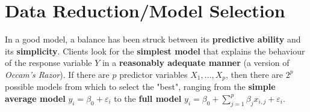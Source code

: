 
\section{Data Reduction/Model Selection} \label{sec:Data.Red}
In a good model, a balance has been struck between its \textbf{predictive ability} and its \textbf{simplicity}. Clients look for the \textbf{simplest model} that explains the behaviour of the response variable $Y$ in a \textbf{reasonably adequate manner} (a version of \textit{Occam's Razor}). If there are $p$ predictor variables $X_1,\ldots,X_p$, then there are $2^{p}$ possible models from which to select the "best", ranging from the \textbf{simple average model} ${y}_{i}=\beta_{0}+\varepsilon_{i}$ to the \textbf{full model} ${y}_{i}=\beta_{0}+\sum_{j=1}^{p}\beta_{j}x_{i,j}+\varepsilon_{i}$.

